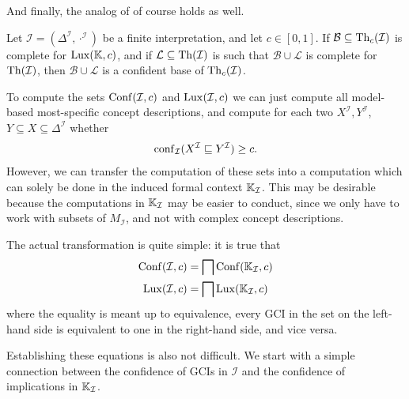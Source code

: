And finally, the analog of  of course holds as well.

\begin{Corollary}
  \label{cor:weakened-luxenburger-base-for-gcis}
  Let $\mathcal{I} = (\Delta^{\mathcal{I}}, \cdot^{\mathcal{I}})$ be a finite
  interpretation, and let $c \in [0,1]$.  If $\mathcal{B} \subseteq \operatorname{Th}_c(\mathcal{I})$ is
  complete for $\operatorname{Lux}({\mathbb{K}}, c)$, and if $\mathcal{L} \subseteq \operatorname{Th}(\mathcal{I})$ is such
  that $\mathcal{B} \cup \mathcal{L}$ is complete for $\operatorname{Th}(\mathcal{I})$, then
  $\mathcal{B} \cup \mathcal{L}$ is a confident base of $\operatorname{Th}_c(\mathcal{I})$.
\end{Corollary}

To compute the sets $\operatorname{Conf}(\mathcal{I}, c)$ and $\operatorname{Lux}(\mathcal{I}, c)$ we can just compute
all model-based most-specific concept descriptions, and compute for each two
$X^{\mathcal{I}}, Y^{\mathcal{I}}$, $Y \subseteq X \subseteq \Delta^{\mathcal{I}}$ whether
\begin{equation*}
  \operatorname{conf}_{\mathcal{I}}(X^{\mathcal{I}} \sqsubseteq Y^{\mathcal{I}}) \ge c.
\end{equation*}
However, we can transfer the computation of these sets into a computation which can solely
be done in the induced formal context ${\mathbb{K}}_{\mathcal{I}}$.  This may be desirable
because the computations in ${\mathbb{K}}_{\mathcal{I}}$ may be easier to conduct, since we only
have to work with subsets of $M_{\mathcal{I}}$, and not with complex concept descriptions.

The actual transformation is quite simple: it is true that
\begin{equation}
  \label{eq:31}
  \begin{aligned}
    \operatorname{Conf}(\mathcal{I}, c) &= \bigsqcap \operatorname{Conf}({\mathbb{K}}_{\mathcal{I}}, c) \\
    \operatorname{Lux}(\mathcal{I}, c) &= \bigsqcap \operatorname{Lux}({\mathbb{K}}_{\mathcal{I}}, c)
  \end{aligned}
\end{equation}
where the equality is meant up to equivalence, \ie every GCI in the set on the left-hand
side is equivalent to one in the right-hand side, and vice versa.

Establishing these equations is also not difficult.  We start with a simple connection
between the confidence of GCIs in $\mathcal{I}$ and the confidence of implications in
${\mathbb{K}}_{\mathcal{I}}$.

